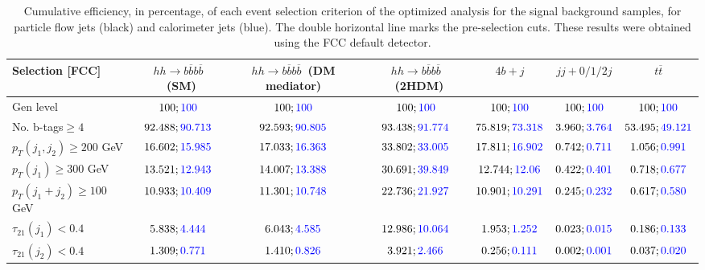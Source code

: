 \begin{landscape}
		\begin{table}
			\centering
			\caption{Cumulative efficiency, in percentage, of each event selection criterion of the optimized analysis for the signal background samples, for particle flow jets (black) and calorimeter jets (blue). The double horizontal line marks the pre-selection cuts. These results were obtained using the FCC default detector.}
			\begin{tabular}{lcccccc}
				\toprule 
				\textbf{Selection [FCC]} & $hh\rightarrow b\overline{b}b\overline{b}$~(SM) & $hh\rightarrow b\overline{b}b\overline{b}$~(DM mediator) & $hh\rightarrow b\overline{b}b\overline{b}$~(2HDM) & $4b+j$  & $jj+0/1/2 j$ & $t\overline{t}$ \\
				\midrule
				Gen level & $100;\textcolor{blue}{100}$ & $100;\textcolor{blue}{100}$ &$100;\textcolor{blue}{100}$& $100;\textcolor{blue}{100}$& $100;\textcolor{blue}{100}$& $100;\textcolor{blue}{100}$ \\
				\rowcolor{black!7}No. b-tags$\geq 4$&$92.488;\textcolor{blue}{90.713}$&$92.593;\textcolor{blue}{90.805}$&$93.438;\textcolor{blue}{91.774}$&$75.819;\textcolor{blue}{73.318}$&$3.960;\textcolor{blue}{3.764}$&$53.495;\textcolor{blue}{49.121}$\\
				$p_T(j_1,j_2)\geq200$ GeV & $16.602;\textcolor{blue}{15.985}$ & $17.033;\textcolor{blue}{16.363}$&$33.802;\textcolor{blue}{33.005}$ &$17.811;\textcolor{blue}{16.902}$&$0.742;\textcolor{blue}{0.711}$&$1.056;\textcolor{blue}{0.991}$\\ 
				\midrule \midrule
				\rowcolor{black!7}$p_T(j_1)\geq 300$ GeV & $13.521;\textcolor{blue}{12.943}$ &$14.007;\textcolor{blue}{13.388}$  &$30.691;\textcolor{blue}{39.849}$&$12.744;\textcolor{blue}{12.06}$&$0.422;\textcolor{blue}{0.401}$&$0.718;\textcolor{blue}{0.677}$\\ 
				$p_T(j_1+j_2)\geq 100$ GeV &$10.933;\textcolor{blue}{10.409}$ & $11.301;\textcolor{blue}{10.748}$ &$22.736;\textcolor{blue}{21.927}$&$10.901;\textcolor{blue}{10.291}$&$0.245;\textcolor{blue}{0.232}$&$0.617;\textcolor{blue}{0.580}$\\
				\rowcolor{black!7}$\tau_{21}(j_1)<0.4$ & $5.838;\textcolor{blue}{4.444}$& $6.043;\textcolor{blue}{4.585}$&$12.986;\textcolor{blue}{10.064}$&$1.953;\textcolor{blue}{1.252}$&$0.023;\textcolor{blue}{0.015}$&$0.186;\textcolor{blue}{0.133}$\\
				$\tau_{21}(j_2)<0.4$ &$1.309;\textcolor{blue}{0.771}$ &$1.410;\textcolor{blue}{0.826}$ &$3.921;\textcolor{blue}{2.466}$&$0.256;\textcolor{blue}{0.111}$&$0.002;\textcolor{blue}{0.001}$&$0.037;\textcolor{blue}{0.020}$\\

\end{tabular}
\end{table}
\end{landscape}
